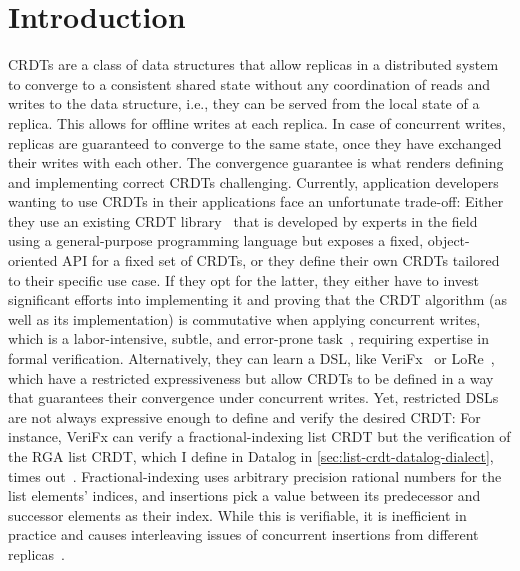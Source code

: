
\chapter{Introduction}\label{ch:intro}

\Acp{CRDT} are a class of data structures that allow replicas in a distributed
system to converge to a consistent shared state without any coordination
of reads and writes to the data structure, i.e., they can be served from the
local state of a replica.
This allows for offline writes at each replica.
In case of concurrent writes, replicas are guaranteed to converge to the same state,
once they have exchanged their writes with each other.
The convergence guarantee is what renders defining and implementing
correct \acp{CRDT} challenging.
Currently, application developers wanting to use \acp{CRDT} in their applications
face an unfortunate trade-off:
Either they use an existing \ac{CRDT} library~\cite{automerge,yjs,lore}
that is developed by experts in the field using a general-purpose programming language
but exposes a fixed, object-oriented \acs{API} for a fixed set of \acp{CRDT},
or they define their own \acp{CRDT} tailored to their specific use case.
If they opt for the latter, they either have to invest significant efforts
into implementing it and proving that the \ac{CRDT} algorithm
(as well as its implementation) is commutative when applying concurrent writes,
which is a labor-intensive, subtle, and error-prone
task~\cite{gomes2017verifying,kleppmann2022assessing},
requiring expertise in formal verification.
Alternatively, they can learn a \ac{DSL}, like VeriFx~\cite{verifx}
or LoRe~\cite{lore}, which have a restricted expressiveness but allow
\acp{CRDT} to be defined in a way that guarantees their convergence under
concurrent writes.
Yet, restricted \acp{DSL} are not always expressive enough
to define and verify the desired \ac{CRDT}:
For instance, VeriFx can verify a fractional-indexing list \ac{CRDT}
but the verification of the \acs{RGA} list \ac{CRDT}, which I define in Datalog in
\ref{sec:list-crdt-datalog-dialect}, times out~\cite{verifx}.
Fractional-indexing uses arbitrary precision rational numbers for the list
elements' indices, and insertions pick a value between its predecessor and
successor elements as their index.
While this is verifiable, it is inefficient in practice and causes
interleaving issues of concurrent insertions from different replicas~\cite{fugue}.

